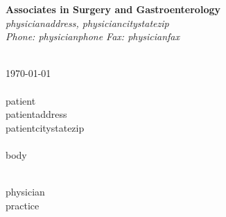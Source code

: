 \documentclass{article}
\begin{document}
\begin{center}
	{\textbf{Associates in Surgery and Gastroenterology}} \\
	\textsl{{{physicianaddress}}, {{physiciancitystatezip}}} \\
	\textsl{Phone: {{physicianphone}} Fax: {{physicianfax}}}
\end{center}

\flushleft

\  \\

\today \\

\  \\

{{patient}} \\
{{patientaddress}} \\
{{patientcitystatezip}} \\

\  \\

{{body}}

\  \\

{{physician}} \\
{{practice}}
\end{document}
